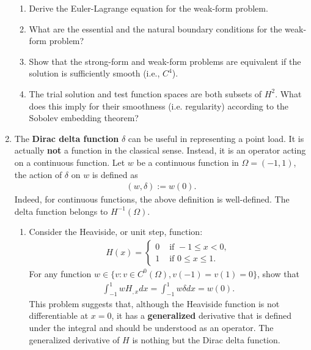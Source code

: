 \documentclass[12pt]{article}
\begin{document}
\begin{enumerate}
\begin{enumerate}
\item Derive the Euler-Lagrange equation for the weak-form problem.

\item What are the essential and the natural boundary conditions for the weak-form problem?

\item Show that the strong-form and weak-form problems are equivalent if the solution is sufficiently smooth (i.e., $C^4$).

\item The trial solution and test function spaces are both subsets of $H^2$. What does this imply for their smoothness (i.e. regularity) according to the Sobolev embedding theorem?

\end{enumerate}

\item The \textbf{Dirac delta function} $\delta$ can be useful in representing a point load. It is actually \textbf{not} a function in the classical sense. Instead, it is an operator acting on a continuous function. Let $w$ be a continuous function in $\Omega = (-1, 1)$, the action of $\delta$ on $w$ is defined as
\begin{align*}
\left( w, \delta \right) := w(0).
\end{align*}
Indeed, for continuous functions, the above definition is well-defined. The delta function belongs to $H^{-1}(\Omega)$.

\begin{enumerate}
\item Consider the Heaviside, or unit step, function:
\begin{align*}
H(x) = \begin{cases}
0 & \text{ if } -1 \leq x < 0, \\
1 & \text{ if } 0 \leq x \leq 1.
\end{cases}
\end{align*}
For any function $w \in \lbrace v : v \in C^0(\Omega), v(-1) = v(1) = 0 \rbrace$,
show that
\begin{align*}
\int_{-1}^{1} w H_{,x} dx = \int_{-1}^1 w \delta dx = w(0).
\end{align*}
This problem suggests that, although the Heaviside function is not differentiable at $x=0$, it has a \textbf{generalized} derivative that is defined under the integral and should be understood as an operator. The generalized derivative of $H$ is nothing but the Dirac delta function.


\end{enumerate}
\end{enumerate}
\end{document}
